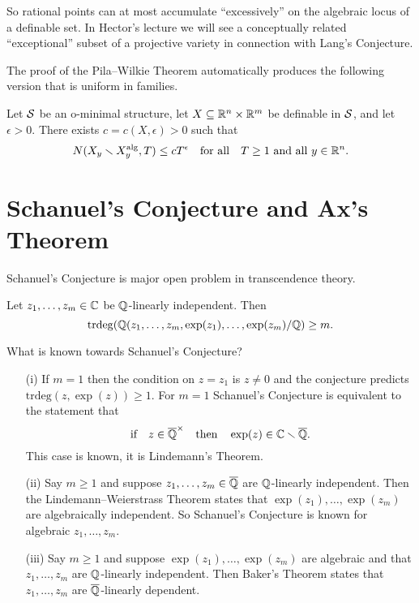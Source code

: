 So rational points can at most accumulate ``excessively'' on the
algebraic locus of a definable set. In Hector's lecture we
will see a conceptually related
``exceptional'' subset of a projective variety in connection with
Lang's Conjecture.

The proof of the Pila--Wilkie Theorem automatically produces the
following version that is uniform in families. 

\begin{theorem}
  Let ${\mathcal S}$ be an o-minimal structure,  let $X\subseteq{\mathbb{R}}^n\times {\mathbb{R}}^m$ be
  definable in ${\mathcal S}$, and let $\epsilon >0$.
  There exists  $c=c(X,\epsilon)>0$ such that
  \begin{equation*}
    N(X_y\smallsetminus X_y^{\mathrm{alg}},T)\le c T^\epsilon \quad\text{for
      all}\quad T\ge 1\text{ and all }y\in{\mathbb{R}}^n. 
  \end{equation*}
\end{theorem}

\section{Schanuel's Conjecture and Ax's Theorem}

Schanuel's Conjecture is major open problem in transcendence theory.

\begin{conjecture}[Schanuel]
  Let $z_1,\ldots,z_m\in{\mathbb{C}}$ be ${\mathbb{Q}}$-linearly independent. Then
  \begin{equation*}
    \mathrm{trdeg}({\mathbb{Q}}(z_1,\ldots,z_m,\exp(z_1),\ldots,\exp(z_m)/{\mathbb{Q}}) \ge
    m. 
  \end{equation*}
\end{conjecture}

\begin{example} What is known towards Schanuel's Conjecture?
  \begin{enumerate}
  \item [(i)]
  If $m=1$ then the condition on $z=z_1$ is $z\not=0$ and the
  conjecture predicts $\mathrm{trdeg}(z,\exp(z))\ge 1$.
  For $m=1$ Schanuel's Conjecture is equivalent to the statement that
  \begin{equation*}
    \text{if}\quad z\in{\overline{\mathbb{Q}}}^\times \quad\text{then}\quad \exp(z)\in {\mathbb{C}}\smallsetminus {\overline{\mathbb{Q}}}.
  \end{equation*}
  This case is known, it is Lindemann's Theorem.
  \item[(ii)] Say $m\ge 1$ and suppose $z_1,\ldots,z_m\in{\overline{\mathbb{Q}}}$ are
    ${\mathbb{Q}}$-linearly independent. Then the Lindemann--Weierstrass
    Theorem states that $\exp(z_1),\ldots,\exp(z_m)$ are algebraically
    independent. So Schanuel's Conjecture is known for algebraic $z_1,\ldots,z_m$.
  \item[(iii)] Say $m\ge 1$ and suppose $\exp(z_1),\ldots,\exp(z_m)$
    are algebraic and that $z_1,\ldots,z_m$ are ${\mathbb{Q}}$-linearly
    independent. Then Baker's Theorem states that $z_1,\ldots,z_m$ are
    ${\overline{\mathbb{Q}}}$-linearly dependent. 
\end{enumerate}
\end{example}

